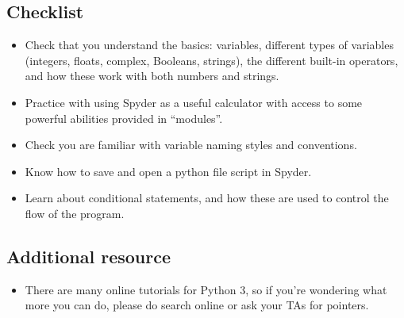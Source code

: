 \documentclass[11pt]{report}
\begin{document}
\begin{Exercise}[title=Conditionals]
    
\end{Exercise}



\subsection*{Checklist}
\begin{itemize}

	\item Check that you understand the basics: variables, different types of variables (integers, floats, complex, Booleans, strings), the different built-in operators, and how these work with both numbers and strings.
	\item Practice with using Spyder as a useful calculator with access to some powerful abilities provided in ``modules''.
    \item Check you are familiar with variable naming styles and conventions.
    \item Know how to save and open a python file script in Spyder.
    \item Learn about conditional statements, and how these are used to control the flow of the program.
\end{itemize}

\subsection*{Additional resource}
\begin{itemize}
	\item There are many online tutorials for Python 3, so if you're wondering what more you can do, please do search online or ask your TAs for pointers.
\end{itemize}
\end{document}
